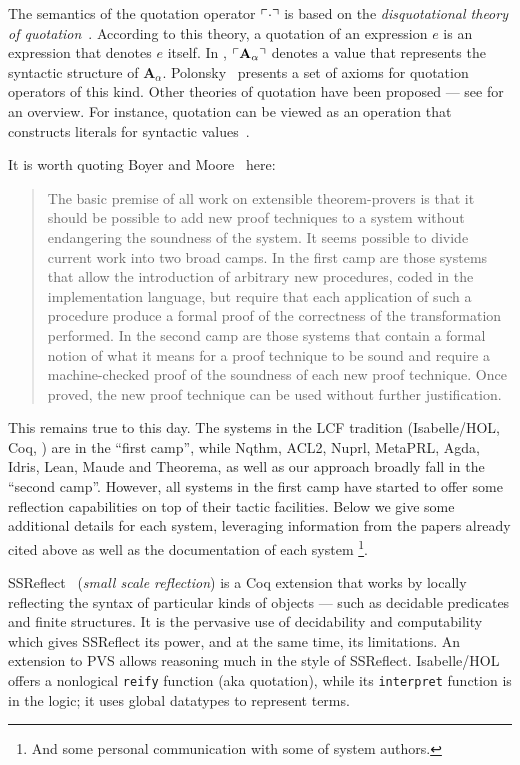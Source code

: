 \documentclass[fleqn]{llncs}
\begin{document}
The semantics of the quotation operator $\ulcorner\cdot\urcorner$ is based on
the \emph{disquotational theory of quotation}~\cite{Quotation12}.
According to this theory, a quotation of an expression $e$ is an
expression that denotes $e$ itself.  In {\churchqe},
$\ulcorner\textbf{A}_\alpha\urcorner$ denotes a value that represents the
syntactic structure of $\textbf{A}_\alpha$.  Polonsky~\cite{Polonsky11} 
presents a set of axioms for quotation operators of this
kind.  Other theories of quotation have been proposed --- see
\cite{Quotation12} for an overview.  For instance, quotation can be viewed as
an operation that constructs literals for syntactic values~\cite{Rabe15}.

It is worth quoting Boyer and Moore~\cite{BoyerMoore81} here:
\begin{quote}
The basic premise of all work on extensible
theorem-provers is that it should be possible to add new proof
techniques to a system without endangering the soundness of the system.
It seems possible to divide current work into two broad camps. In the
first camp are those systems that allow the introduction of arbitrary
new procedures, coded in the implementation language, but require that
each application of such a procedure produce a formal proof of the
correctness of the transformation performed. In the second camp are
those systems that contain a formal notion of what it means for a proof
technique to be sound and require a machine-checked proof of the
soundness of each new proof technique. Once proved, the new proof
technique can be used without further justification. 
\end{quote}
This remains true to this day. The systems in the LCF tradition (Isabelle/HOL,
Coq, \HL) are in the ``first camp'',
while Nqthm, ACL2, Nuprl, MetaPRL, Agda, Idris, Lean, Maude and Theorema, 
as well as our approach broadly fall in the ``second camp''. However,
all systems in the first camp have started to offer some reflection
capabilities on top of their tactic facilities. Below we give some 
additional details for each system, leveraging information from the papers 
already cited above as well as the documentation of each system%
\footnote{And some personal communication with some of system authors.}.

\textrm{SSReflect}~\cite{gonthier2010introduction} (\emph{small scale
reflection}) is a Coq extension that works by locally reflecting the
syntax of particular kinds of objects --- such as decidable predicates
and finite structures.  It is the pervasive use of decidability and
computability which gives \textrm{SSReflect} its power, and at the
same time, its limitations.  An extension to PVS allows reasoning much
in the style of \textrm{SSReflect}.  Isabelle/HOL offers a nonlogical
\texttt{reify} function (aka quotation), while its \texttt{interpret}
function is in the logic; it uses global datatypes to represent {\HOL}
terms.
\end{document}
